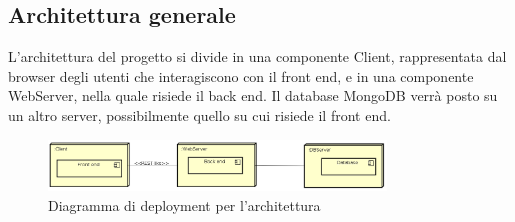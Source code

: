\begin{itemize}
\subsection{Architettura generale}
L'architettura del progetto si divide in una componente Client, rappresentata dal browser degli utenti che interagiscono con il front end, e in una componente WebServer, nella quale risiede il back end. Il database MongoDB verrà posto su un altro server, possibilmente quello su cui risiede il front end. \\
\begin{figure}[h]
\centering
\includegraphics[width=0.8\textwidth]{res/sections/GeneralArchitecture.png}
\caption{Diagramma di deployment per l'architettura}
\end{figure}

\end{itemize}
